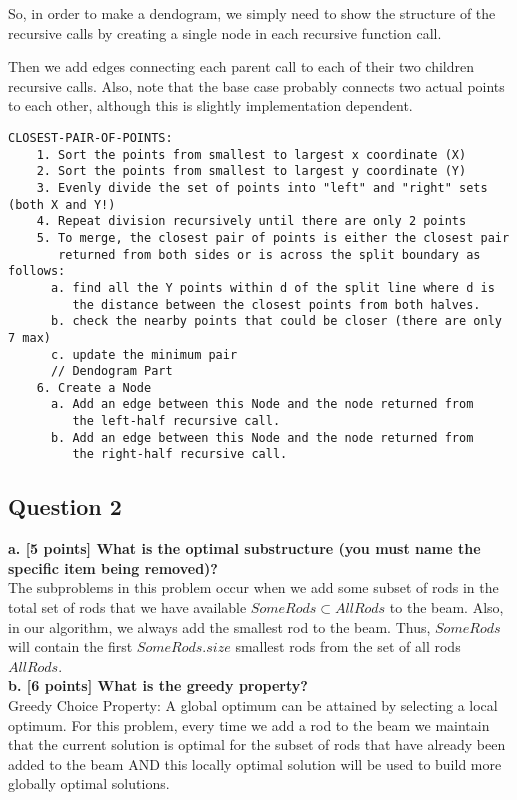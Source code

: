 \documentclass[12pt]{article}
\begin{document}
So, in order to make a dendogram, we simply need to show the structure of the recursive calls by 
creating a single node in each recursive function call. 

Then we add edges connecting each parent call to each of their two children recursive calls. 
Also, note that the base case probably connects two actual points to each other, 
although this is slightly implementation dependent.

\begin{verbatim}
CLOSEST-PAIR-OF-POINTS:
	1. Sort the points from smallest to largest x coordinate (X)
	2. Sort the points from smallest to largest y coordinate (Y)
	3. Evenly divide the set of points into "left" and "right" sets (both X and Y!)
	4. Repeat division recursively until there are only 2 points
	5. To merge, the closest pair of points is either the closest pair 
	   returned from both sides or is across the split boundary as follows:
	  a. find all the Y points within d of the split line where d is 
	     the distance between the closest points from both halves.
	  b. check the nearby points that could be closer (there are only 7 max)
	  c. update the minimum pair 
	  // Dendogram Part
	6. Create a Node 
	  a. Add an edge between this Node and the node returned from 
	     the left-half recursive call.
	  b. Add an edge between this Node and the node returned from 
	     the right-half recursive call.
\end{verbatim}

\newpage
\subsection*{Question 2}
\textbf{a. [5 points] What is the optimal substructure (you must name the specific item being removed)?} \\

The subproblems in this problem occur when we add some subset of rods in the total set of rods that we have available $SomeRods \subset AllRods$ to the beam. Also, in our algorithm, we always add the smallest rod to the beam. Thus, $SomeRods$ will contain the first $SomeRods.size$ smallest rods from the set of all rods $AllRods$.  \\

\noindent \textbf{b. [6 points] What is the greedy property? } \\

Greedy Choice Property: A global optimum can be attained by selecting a local optimum. For this problem, every time we add a rod to the beam we maintain that the current solution is optimal for the subset of rods that have already been added to the beam AND this locally optimal solution will be used to build more globally optimal solutions. 
\end{document}
